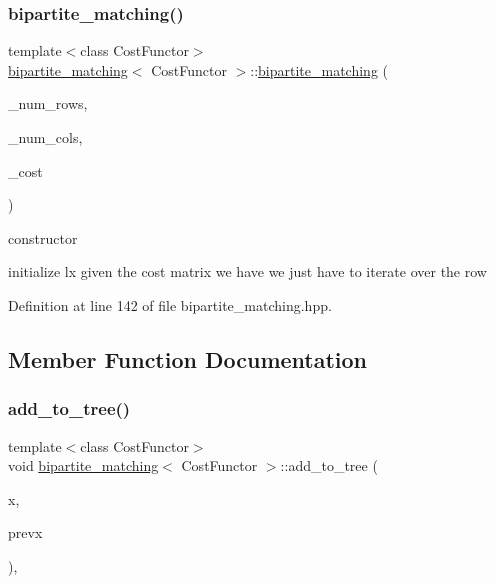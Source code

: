 \subsubsection{\texorpdfstring{bipartite\+\_\+matching()}{bipartite\_matching()}}
{\footnotesize\ttfamily template$<$class Cost\+Functor$>$ \\
\hyperlink{classbipartite__matching}{bipartite\+\_\+matching}$<$ Cost\+Functor $>$\+::\hyperlink{classbipartite__matching}{bipartite\+\_\+matching} (\begin{DoxyParamCaption}\item[{\hyperlink{tutorial__fpt__2017_2intro_2sixth_2test_8c_a7c94ea6f8948649f8d181ae55911eeaf}{size\+\_\+t}}]{\+\_\+num\+\_\+rows,  }\item[{\hyperlink{tutorial__fpt__2017_2intro_2sixth_2test_8c_a7c94ea6f8948649f8d181ae55911eeaf}{size\+\_\+t}}]{\+\_\+num\+\_\+cols,  }\item[{const Cost\+Functor \&}]{\+\_\+cost }\end{DoxyParamCaption})\hspace{0.3cm}{\ttfamily [inline]}}



constructor 

initialize lx given the cost matrix we have we just have to iterate over the row 

Definition at line 142 of file bipartite\+\_\+matching.\+hpp.



\subsection{Member Function Documentation}
\mbox{\label{classbipartite__matching_a7c38ddd8d6f908213c184a094a79d860}} 
\subsubsection{\texorpdfstring{add\+\_\+to\+\_\+tree()}{add\_to\_tree()}}
{\footnotesize\ttfamily template$<$class Cost\+Functor$>$ \\
void \hyperlink{classbipartite__matching}{bipartite\+\_\+matching}$<$ Cost\+Functor $>$\+::add\+\_\+to\+\_\+tree (\begin{DoxyParamCaption}\item[{\hyperlink{tutorial__fpt__2017_2intro_2sixth_2test_8c_a7c94ea6f8948649f8d181ae55911eeaf}{size\+\_\+t}}]{x,  }\item[{\hyperlink{tutorial__fpt__2017_2intro_2sixth_2test_8c_a7c94ea6f8948649f8d181ae55911eeaf}{size\+\_\+t}}]{prevx }\end{DoxyParamCaption})\hspace{0.3cm}{\ttfamily [inline]}, {\ttfamily [private]}}



